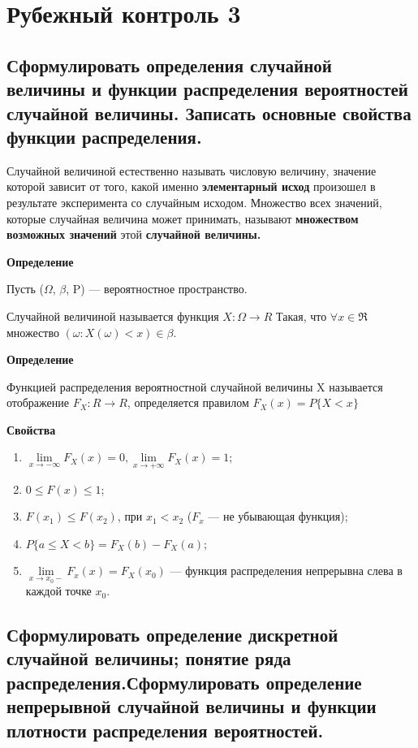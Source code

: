 \section{Рубежный контроль 3}

\subsection{Сформулировать определения случайной величины и функции распределения вероятностей случайной величины. Записать основные свойства функции распределения.}

Случайной величиной естественно называть числовую величину, значение которой зависит от того, какой именно \textbf{элементарный исход} произошел в результате эксперимента со случайным исходом.
Множество всех значений, которые случайная величина может принимать, называют \textbf{множеством возможных значений} этой \textbf{случайной величины.}

\textbf{Определение}

Пусть ($\Omega$, $\beta$, P) --- вероятностное пространство.

Случайной величиной называется функция $X : \Omega \rightarrow R$
Такая, что $\forall x \in \Re$ множество $(\omega : X (\omega) < x) \in \beta$.

\textbf{Определение}

Функцией распределения вероятностной случайной величины X называется отображение $F_X : R \rightarrow R$, определяется правилом $F_X(x) = P\{X < x\}$

\textbf{Свойства}

\begin{enumerate}[label=\arabic*.]
	\item $\lim\limits_{x \rightarrow -\infty}F_X(x) = 0, \lim\limits_{x \rightarrow +\infty}F_X(x) = 1$;
	\item $0 \leq F(x) \leq 1$;
	\item $F(x_1) \leq F(x_2)$, при $x_1 < x_2$ ($F_x$ --- не убывающая функция);
	\item $P\{a \leq X < b\} = F_X(b) - F_X(a)$;
	\item $\lim\limits_{x \rightarrow x_0-}F_x(x) = F_X(x_0)$ --- функция распределения непрерывна слева в каждой точке $x_0$.
\end{enumerate}

\subsection{Сформулировать определение дискретной случайной величины; понятие ряда распределения.Сформулировать определение непрерывной случайной величины и функции плотности распределения вероятностей.}

